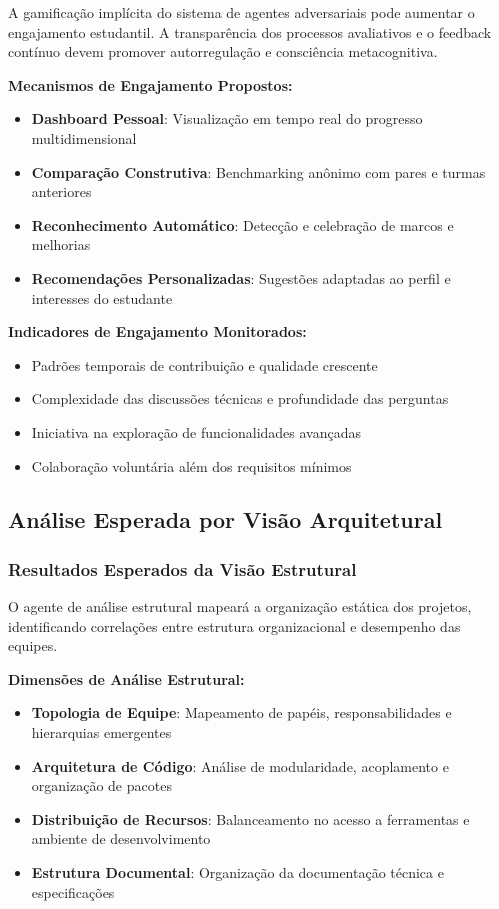 \documentclass[english, spanish, brazilian]{modelo_dt}
\begin{document}
A gamificação implícita do sistema de agentes adversariais pode aumentar o engajamento estudantil. A transparência dos processos avaliativos e o feedback contínuo devem promover autorregulação e consciência metacognitiva.

\textbf{Mecanismos de Engajamento Propostos:}
\begin{itemize}
\item \textbf{Dashboard Pessoal}: Visualização em tempo real do progresso multidimensional
\item \textbf{Comparação Construtiva}: Benchmarking anônimo com pares e turmas anteriores
\item \textbf{Reconhecimento Automático}: Detecção e celebração de marcos e melhorias
\item \textbf{Recomendações Personalizadas}: Sugestões adaptadas ao perfil e interesses do estudante
\end{itemize}

\textbf{Indicadores de Engajamento Monitorados:}
\begin{itemize}
\item Padrões temporais de contribuição e qualidade crescente
\item Complexidade das discussões técnicas e profundidade das perguntas
\item Iniciativa na exploração de funcionalidades avançadas
\item Colaboração voluntária além dos requisitos mínimos
\end{itemize}

\subsection{Análise Esperada por Visão Arquitetural}

\subsubsection{Resultados Esperados da Visão Estrutural}

O agente de análise estrutural mapeará a organização estática dos projetos, identificando correlações entre estrutura organizacional e desempenho das equipes.

\textbf{Dimensões de Análise Estrutural:}
\begin{itemize}
\item \textbf{Topologia de Equipe}: Mapeamento de papéis, responsabilidades e hierarquias emergentes
\item \textbf{Arquitetura de Código}: Análise de modularidade, acoplamento e organização de pacotes
\item \textbf{Distribuição de Recursos}: Balanceamento no acesso a ferramentas e ambiente de desenvolvimento
\item \textbf{Estrutura Documental}: Organização da documentação técnica e especificações
\end{itemize}
\end{document}
